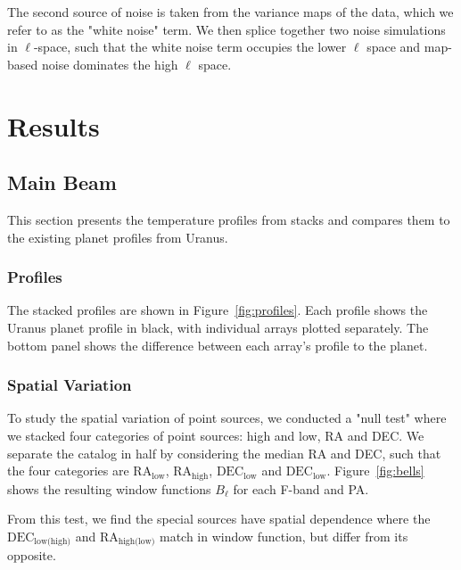 The second source of noise is taken from the variance maps of the data, which we refer to as the "white noise" term.  We then splice together two noise simulations in $\ell$-space, such that the white noise term occupies the lower $\ell$ space and map-based noise dominates the high $\ell$ space.

\section{Results}
\label{sec:results}
\subsection{Main Beam}
\label{subsec:mainbeam}
This section presents the temperature profiles from stacks and compares them to the existing planet profiles from Uranus. 
\subsubsection{Profiles}
\label{subsubsec:profiles}
The stacked profiles are shown in Figure~\ref{fig:profiles}.  Each profile shows the Uranus planet profile in black, with individual arrays plotted separately.  The bottom panel shows the difference between each array's profile to the planet.
\subsubsection{Spatial Variation}
\label{subsubsec:null_mainbeam}

To study the spatial variation of point sources, we conducted a "null test" where we stacked four categories of point sources: high and low, RA and DEC.  We separate the catalog in half by considering the median RA and DEC, such that the four categories are $\text{RA}_{\text{low}}$, $\text{RA}_{\text{high}}$, $\text{DEC}_{\text{low}}$ and $\text{DEC}_{\text{low}}$. 
 Figure~\ref{fig:bells} shows the resulting window functions $B_{\ell}$ for each F-band and PA.

From this test, we find the special sources have spatial dependence where the $\text{DEC}_{\text{low(high)}}$ and $\text{RA}_{\text{high(low)}}$ match in window function, but differ from its opposite.

